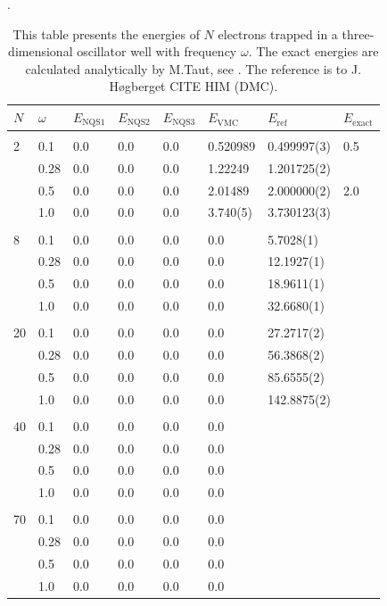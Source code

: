\begin{table} [H]
	\caption{This table presents the energies of $N$ electrons trapped in a three-dimensional oscillator well with frequency $\omega$. The exact energies are calculated analytically by M.Taut, see \cite{taut_two_1993}. The reference is to J. Høgberget CITE HIM (DMC). }. 
	\begin{tabularx}{\textwidth}{l:l|XXXXXX} \hline\hline
		\label{tab:quantumdotswinteraction3D}
		$N$ & $\omega$ & $E_{\text{NQS1}}$ & $E_{\text{NQS2}}$ & $E_{\text{NQS3}}$ & $E_{\text{VMC}}$ & $E_{\text{ref}} $ & $E_{\text{exact}}$ \\ \hline \\
		2 & 0.1 & 0.0 & 0.0 & 0.0 & 0.520989 & 0.499997(3) & 0.5 \\
		& 0.28 & 0.0 & 0.0 & 0.0 & 1.22249 & 1.201725(2) & \\
		& 0.5 & 0.0 & 0.0 & 0.0 & 2.01489 & 2.000000(2) & 2.0 \\
		& 1.0 & 0.0 & 0.0 & 0.0 & 3.740(5) & 3.730123(3) &  \\ \hdashline \\
		
		8 & 0.1 & 0.0 & 0.0 & 0.0 & 0.0 & 5.7028(1) \\ 
		& 0.28 & 0.0 & 0.0 & 0.0 & 0.0 & 12.1927(1) \\
		& 0.5 & 0.0 & 0.0 & 0.0 & 0.0 & 18.9611(1) \\
		& 1.0 & 0.0 & 0.0 & 0.0 & 0.0 & 32.6680(1) \\ \hdashline \\
		
		20 & 0.1 & 0.0 & 0.0 & 0.0 & 0.0 & 27.2717(2) \\ 
		& 0.28 & 0.0 & 0.0 & 0.0 & 0.0 & 56.3868(2) \\
		& 0.5 & 0.0 & 0.0 & 0.0 & 0.0 & 85.6555(2) \\
		& 1.0 & 0.0 & 0.0 & 0.0 & 0.0 & 142.8875(2) \\ \hdashline \\
		
		40 & 0.1 & 0.0 & 0.0 & 0.0 & 0.0 \\ 
		& 0.28 & 0.0 & 0.0 & 0.0 & 0.0 \\
		& 0.5 & 0.0 & 0.0 & 0.0 & 0.0 \\
		& 1.0 & 0.0 & 0.0 & 0.0 & 0.0 \\ \hdashline \\
		
		70 & 0.1 & 0.0 & 0.0 & 0.0 & 0.0 \\ 
		& 0.28 & 0.0 & 0.0 & 0.0 & 0.0 \\
		& 0.5 & 0.0 & 0.0 & 0.0 & 0.0 \\
		& 1.0 & 0.0 & 0.0 & 0.0 & 0.0 \\ \hline\hline
	\end{tabularx}
\end{table}
